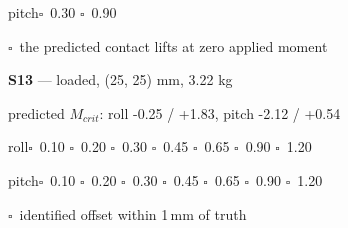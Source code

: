 \documentclass[10pt]{article}
\begin{document}
\hspace*{6mm}pitch\quad $\square$~0.30 \quad $\square$~0.90\par
\hspace*{6mm}$\square$~the predicted contact lifts at zero applied moment\par\medskip
\textbf{S13} --- loaded, (25, 25) mm, 3.22 kg\par
\hspace*{6mm}\footnotesize predicted $M_{crit}$: roll -0.25 / +1.83, pitch -2.12 / +0.54\normalsize\par
\hspace*{6mm}roll\quad $\square$~0.10 \quad $\square$~0.20 \quad $\square$~0.30 \quad $\square$~0.45 \quad $\square$~0.65 \quad $\square$~0.90 \quad $\square$~1.20\par
\hspace*{6mm}pitch\quad $\square$~0.10 \quad $\square$~0.20 \quad $\square$~0.30 \quad $\square$~0.45 \quad $\square$~0.65 \quad $\square$~0.90 \quad $\square$~1.20\par
\hspace*{6mm}$\square$~identified offset within 1\,mm of truth\par\medskip
\end{document}

